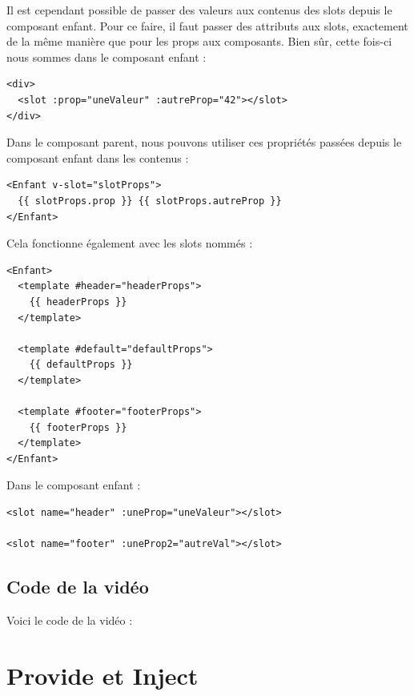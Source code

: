 Il est cependant possible de passer des valeurs aux contenus des {\color{monOrange}slots} depuis le composant enfant. Pour ce faire, il faut passer des attributs aux {\color{monOrange}slots}, exactement de la même manière que pour les {\color{monOrange}props} aux composants. Bien sûr, cette fois-ci nous sommes dans le composant enfant :
\begin{verbatim}
<div>
  <slot :prop="uneValeur" :autreProp="42"></slot>
</div>
\end{verbatim}
Dans le composant parent, nous pouvons utiliser ces propriétés passées depuis le composant enfant dans les contenus :
\begin{verbatim}
<Enfant v-slot="slotProps">
  {{ slotProps.prop }} {{ slotProps.autreProp }}
</Enfant>
\end{verbatim}
Cela fonctionne également avec les {\color{monOrange}slots} nommés :
\begin{verbatim}
<Enfant>
  <template #header="headerProps">
    {{ headerProps }}
  </template>

  <template #default="defaultProps">
    {{ defaultProps }}
  </template>

  <template #footer="footerProps">
    {{ footerProps }}
  </template>
</Enfant>
\end{verbatim}
Dans le composant enfant :
\begin{verbatim}
<slot name="header" :uneProp="uneValeur"></slot>

<slot name="footer" :uneProp2="autreVal"></slot>
\end{verbatim}
\subsection{Code de la vidéo}
Voici le code de la vidéo :


\section{Provide et Inject}
